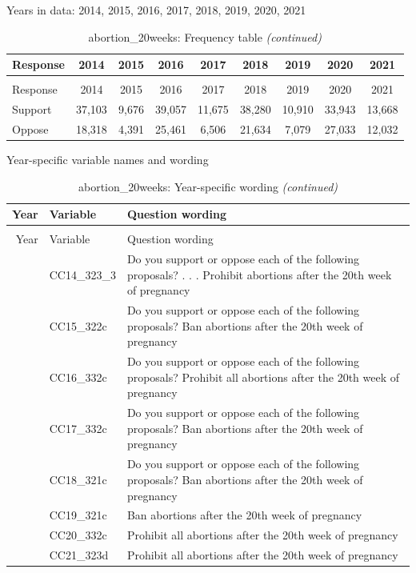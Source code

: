 \documentclass[
  12pt]{article}
\begin{document}
Years in data: 2014, 2015, 2016, 2017, 2018, 2019, 2020,
2021\begingroup\fontsize{10}{12}\selectfont

\begin{longtable}[t]{lcccccccc}
\caption{\label{tab:unnamed-chunk-5}abortion\_20weeks: Frequency table}\\
\toprule
Response & 2014 & 2015 & 2016 & 2017 & 2018 & 2019 & 2020 & 2021\\
\midrule
\endfirsthead
\caption[]{abortion\_20weeks: Frequency table \textit{(continued)}}\\
\toprule
Response & 2014 & 2015 & 2016 & 2017 & 2018 & 2019 & 2020 & 2021\\
\midrule
\endhead

\endfoot
\bottomrule
\endlastfoot
Support & 37,103 & 9,676 & 39,057 & 11,675 & 38,280 & 10,910 & 33,943 & 13,668\\
Oppose & 18,318 & 4,391 & 25,461 & 6,506 & 21,634 & 7,079 & 27,033 & 12,032\\*
\end{longtable}
\endgroup{}

Year-specific variable names and
wording\begingroup\fontsize{11}{13}\selectfont

\begin{longtable}[t]{rl>{\raggedright\arraybackslash}p{10cm}}
\caption{\label{tab:unnamed-chunk-5}abortion\_20weeks: Year-specific wording}\\
\toprule
Year & Variable & Question wording\\
\midrule
\endfirsthead
\caption[]{abortion\_20weeks: Year-specific wording \textit{(continued)}}\\
\toprule
Year & Variable & Question wording\\
\midrule
\endhead

\endfoot
\bottomrule
\endlastfoot
2014 & CC14\_323\_3 & Do you support or oppose each of the following proposals? . . . Prohibit abortions after the 20th week of pregnancy\\
\addlinespace
2015 & CC15\_322c & Do you support or oppose each of the following proposals? Ban abortions after the 20th week of pregnancy\\
\addlinespace
2016 & CC16\_332c & Do you support or oppose each of the following proposals? Prohibit all abortions after the 20th week of pregnancy\\
\addlinespace
2017 & CC17\_332c & Do you support or oppose each of the following proposals? Ban abortions after the 20th week of pregnancy\\
\addlinespace
2018 & CC18\_321c & Do you support or oppose each of the following proposals? Ban abortions after the 20th week of pregnancy\\
\addlinespace
2019 & CC19\_321c & Ban abortions after the 20th week of pregnancy\\
\addlinespace
2020 & CC20\_332c & Prohibit all abortions after the 20th week of pregnancy\\
\addlinespace
2021 & CC21\_323d & Prohibit all abortions after the 20th week of pregnancy\\*
\end{longtable}
\endgroup{}
\end{document}
